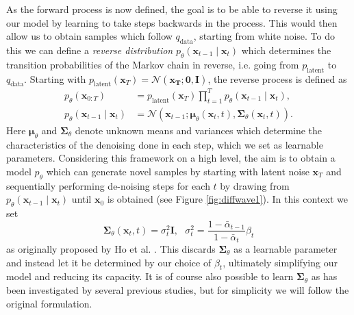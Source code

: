 \documentclass{report}
\begin{document}
As the forward process is now defined, the goal is to be able to reverse it using our model by learning to take steps backwards in the process. This would then allow us to obtain samples which follow $q_{\text{data}}$, starting from white noise. To do this we can define a \textit{reverse distribution} $p_{\theta}(\bm{x}_{t-1} \mid \bm{x}_t)$ which determines the transition probabilities of the Markov chain in reverse, i.e. going from $p_{\text{latent}}$ to $q_{\text{data}}$. Starting with $p_{\text{latent}}(\bm{x}_T)=\mathcal{N}(\bm{x_T}; \bm{0}, \bm{I})$, the reverse process is defined as
\begin{align}
    p_{\theta}(\bm{x}_{0:T}) &= p_{\text{latent}}(\bm{x}_T) \prod_{t=1}^{T} p_{\theta}(\bm{x}_{t-1} \mid \bm{x}_{t}), \\
    p_{\theta}(\bm{x}_{t-1} \mid \bm{x}_{t}) &= \mathcal{N}(\bm{x}_{t-1} ; \bm{\mu}_{\theta}(\bm{x}_t, t), \bm{\Sigma}_{\theta}(\bm{x}_t, t)) \label{eq:ptheta}.
\end{align}
Here $\bm{\mu}_{\theta}$ and $\bm{\Sigma}_{\theta}$ denote unknown means and variances which determine the characteristics of the denoising done in each step, which we set as learnable parameters. Considering this framework on a high level, the aim is to obtain a model $p_\theta$ which can generate novel samples by starting with latent noise $\bm{x}_T$ and sequentially performing de-noising steps for each $t$ by drawing from $p_\theta(\bm{x}_{t-1} \mid \bm{x}_t)$ until $\bm{x}_0$ is obtained (see Figure \ref{fig:diffwave1}). In this context we set
\begin{equation} \label{eq:sigma}
    \bm{\Sigma}_{\theta}(\bm{x}_t, t) = \sigma_t^2\bm{I}, \ \ \ \sigma_t^2 = \frac{1-    \bar{\alpha}_{t-1}}{1-\bar{\alpha}_t}\beta_t    
\end{equation}
as originally proposed by Ho et al. \cite{ho2020denoising}. This discards $\bm{\Sigma}_{\theta}$ as a learnable parameter and instead let it be determined by our choice of $\beta_t$, ultimately simplifying our model and reducing its capacity. It is of course also possible to learn $\bm{\Sigma}_{\theta}$ as has been investigated by several previous studies, but for simplicity we will follow the original formulation.
\end{document}
